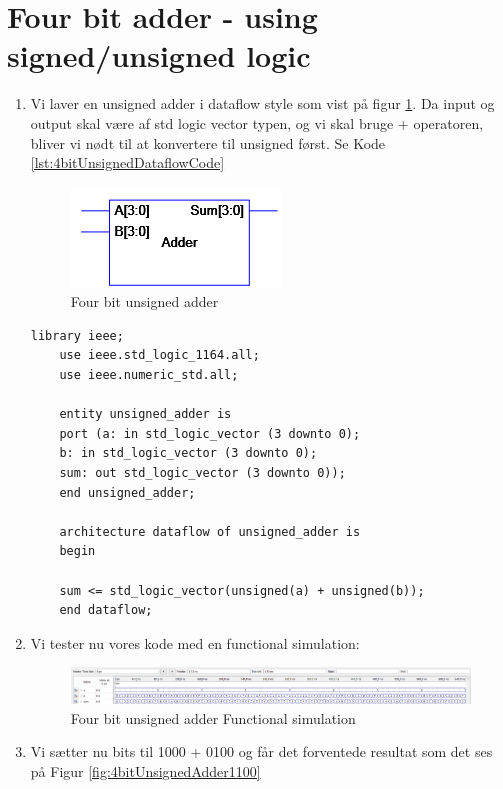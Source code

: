 \newpage
\section{Four bit adder - using signed/unsigned logic}

\begin{enumerate}
	\item[1)]
	Vi laver en unsigned adder i dataflow style som vist på figur \ref{fig:4bitUnsignedAdder}. Da input og output skal være af std logic vector typen, og vi skal bruge + operatoren, bliver vi nødt til at konvertere til unsigned først. Se Kode \ref{lst:4bitUnsignedDataflowCode}\\
	
	\begin{figure}[H]
		\centering
		\includegraphics[scale=0.5]{pictures/Oevelse3/4bit_unsigned_adder.jpg}
		\caption{Four bit unsigned adder}
		\label{fig:4bitUnsignedAdder}
	\end{figure}
	
	\begin{lstlisting}[caption={Four bit unsigned adder Dataflow VHDL kode},label={lst:4bitUnsignedDataflowCode}]
	library ieee;
	use ieee.std_logic_1164.all;
	use ieee.numeric_std.all;
	
	entity unsigned_adder is
	port (a: in std_logic_vector (3 downto 0);
	b: in std_logic_vector (3 downto 0);
	sum: out std_logic_vector (3 downto 0));
	end unsigned_adder;
	
	architecture dataflow of unsigned_adder is
	begin
	
	sum <= std_logic_vector(unsigned(a) + unsigned(b));
	end dataflow;
	\end{lstlisting}
	
	\item[2)]
	Vi tester nu vores kode med en functional simulation:\\
	\begin{figure}[H]	
		\centering
		\includegraphics[scale=0.4]{pictures/Oevelse3/4bit_unsigned_adder_functional_simulation.jpeg}
		\caption{Four bit unsigned adder Functional simulation}
		\label{fig:4bitUnsignedAdderFuncSim}
	\end{figure}
\newpage
	\item[3)]
	Vi sætter nu bits til 1000 + 0100 og får det forventede resultat som det ses på Figur \ref{fig:4bitUnsignedAdder1100}\\
	\begin{figure}[H]
		

\end{figure}
\end{enumerate}

